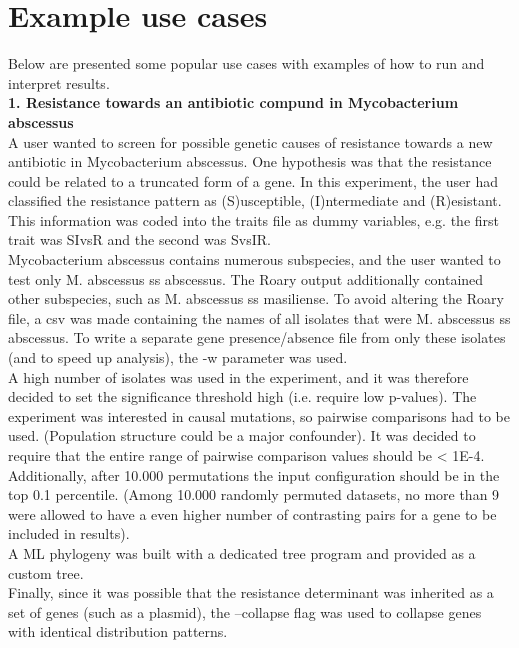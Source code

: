\documentclass{article}
\begin{document}
  \section{Example use cases}
    Below are presented some popular use cases with examples of how to run and interpret results. \\

    \textbf{1. Resistance towards an antibiotic compund in Mycobacterium abscessus} \\
    A user wanted to screen for possible genetic causes of resistance towards a new antibiotic in Mycobacterium abscessus. One hypothesis was that the resistance could be related to a truncated form of a gene. In this experiment, the user had classified the resistance pattern as (S)usceptible, (I)ntermediate and (R)esistant. This information was coded into the traits file as dummy variables, e.g. the first trait was SI\textunderscore vs\textunderscore R and the second was S\textunderscore vs\textunderscore IR. \\

    Mycobacterium abscessus contains numerous subspecies, and the user wanted to test only M. abscessus ss abscessus. The Roary output additionally contained other subspecies, such as M. abscessus ss masiliense. To avoid altering the Roary file, a csv was made containing the names of all isolates that were M. abscessus ss abscessus. To write a separate gene presence/absence file from only these isolates (and to speed up analysis), the -w parameter was used. \\

    A high number of isolates was used in the experiment, and it was therefore decided to set the significance threshold high (i.e. require low p-values). The experiment was interested in causal mutations, so pairwise comparisons had to be used. (Population structure could be a major confounder). It was decided to require that the entire range of pairwise comparison values should be < 1E-4. Additionally, after 10.000 permutations the input configuration should be in the top 0.1 percentile. (Among 10.000 randomly permuted datasets, no more than 9 were allowed to have a even higher number of contrasting pairs for a gene to be included in results). \\

    A ML phylogeny was built with a dedicated tree program and provided as a custom tree. \\

    Finally, since it was possible that the resistance determinant was inherited as a set of genes (such as a plasmid), the --collapse flag was used to collapse genes with identical distribution patterns. \\
\end{document}
